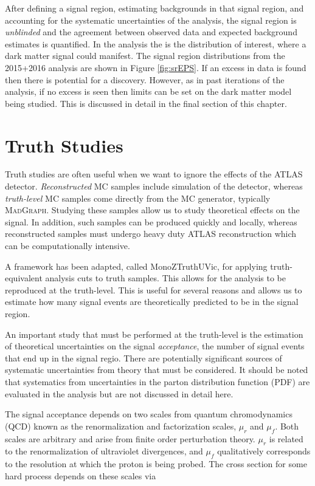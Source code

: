 After defining a signal region, estimating backgrounds in that signal region, and accounting for the systematic uncertainties of the analysis, the signal region is \textit{unblinded} and the agreement between observed data and expected background estimates is quantified. In the \monoZ analysis the \etmiss is the distribution of interest, where a dark matter signal could manifest. The signal region \etmiss distributions from the 2015+2016 analysis are shown in Figure \ref{fig:srEPS}. If an excess in data is found then there is potential for a discovery. However, as in past iterations of the analysis, if no excess is seen then limits can be set on the dark matter model being studied. This is discussed in detail in the final section of this chapter.

\section{Truth Studies} 
\label{sec:truth}

Truth studies are often useful when we want to ignore the effects of the ATLAS detector. \textit{Reconstructed} MC samples include simulation of the detector, whereas \textit{truth-level} MC samples come directly from the MC generator, typically \textsc{MadGraph}. Studying these samples allow us to study theoretical effects on the signal. In addition, such samples can be produced quickly and locally, whereas reconstructed samples must undergo heavy duty ATLAS reconstruction which can be computationally intensive. 

A framework has been adapted, called MonoZTruthUVic, for applying truth-equivalent analysis cuts to truth samples. This allows for the analysis to be reproduced at the truth-level. This is useful for several reasons and allows us to estimate how many signal events are theoretically predicted to be in the signal region.

An important study that must be performed at the truth-level is the estimation of theoretical uncertainties on the signal \textit{acceptance}, the number of signal events that end up in the signal regio. There are potentially significant sources of systematic uncertainties from theory that must be considered. It should be noted that systematics from uncertainties in the parton distribution function (PDF) are evaluated in the analysis but are not discussed in detail here. 

The signal acceptance depends on two scales from quantum chromodynamics (QCD) known as the renormalization and factorization scales, $\mu_r$ and $\mu_f$. Both scales are arbitrary and arise from finite order perturbation theory. $\mu_r$ is related to the renormalization of ultraviolet divergences, and $\mu_f$ qualitatively corresponds to the resolution at which the proton is being probed. The cross section for some hard process depends on these scales via

